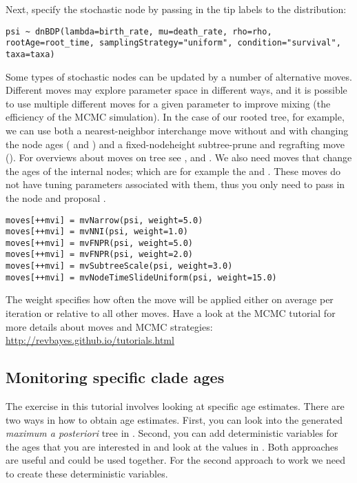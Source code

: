 Next, specify the  stochastic node by passing in the tip labels  to the  distribution:
{\tt \begin{snugshade*}
\begin{lstlisting}
psi ~ dnBDP(lambda=birth_rate, mu=death_rate, rho=rho, rootAge=root_time, samplingStrategy="uniform", condition="survival", taxa=taxa)
\end{lstlisting}
\end{snugshade*}}

Some types of stochastic nodes can be updated by a number of alternative moves. 
Different moves may explore parameter space in different ways, and it is possible to use multiple different moves for a given parameter to improve mixing (the efficiency of the MCMC simulation). 
In the case of our rooted tree, for example, we can use both a nearest-neighbor interchange move without and with changing the node ages ( and ) and a fixed-nodeheight subtree-prune and regrafting move (). 
For overviews about moves on tree see \cite{Lakner2008}, \cite{Hoehna2008} and \cite{Hoehna2012}.
We also need moves that change the ages of the internal nodes; which are for example the  and .
These moves do not have tuning parameters associated with them, thus you only need to pass in the  node and proposal . 
{\tt \begin{snugshade*}
\begin{lstlisting}
moves[++mvi] = mvNarrow(psi, weight=5.0)
moves[++mvi] = mvNNI(psi, weight=1.0)
moves[++mvi] = mvFNPR(psi, weight=5.0)
moves[++mvi] = mvFNPR(psi, weight=2.0)
moves[++mvi] = mvSubtreeScale(psi, weight=3.0)
moves[++mvi] = mvNodeTimeSlideUniform(psi, weight=15.0)
\end{lstlisting}
\end{snugshade*}}
The weight specifies how often the move will be applied either on average per iteration or relative to all other moves.
Have a look at the MCMC tutorial for more details about moves and MCMC strategies: \href{http://revbayes.github.io/tutorials.html}{http://revbayes.github.io/tutorials.html}

\subsection{Monitoring specific clade ages}

The exercise in this tutorial involves looking at specific age estimates.
There are two ways in \RevBayes how to obtain age estimates.
First, you can look into the generated \emph{maximum a posteriori} tree in \FigTree.
Second, you can add deterministic variables for the ages that you are interested in and look at the values in \Tracer.
Both approaches are useful and could be used together.
For the second approach to work we need to create these deterministic variables.

